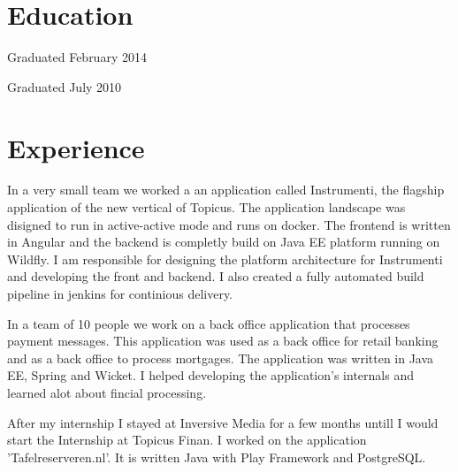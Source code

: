 \documentclass[]{deedy-resume-openfont}
\begin{document}
\begin{minipage}[t]{0.66\textwidth} 
	

\section{Education} 

Graduated February 2014 
\sectionsep

Graduated July 2010 
\sectionsep


\section{Experience}

In a very small team we worked a an application called Instrumenti, the flagship application of the new vertical of Topicus.
The application landscape was disigned to run in active-active mode and runs on docker. 
The frontend is written in Angular and the backend is completly build on Java EE platform running on Wildfly.
I am responsible for designing the platform architecture for Instrumenti and developing the front and backend.
I also created a fully automated build pipeline in jenkins for continious delivery.
\sectionsep

In a team of 10 people we work on a back office application that processes payment messages. 
This application was used as a back office for retail banking and as a back office to process mortgages.
The application was written in Java EE, Spring and Wicket.
I helped developing the application's internals and learned alot about fincial processing. 
\sectionsep

After my internship I stayed at Inversive Media for a few months untill I would start the Internship at Topicus Finan.
I worked on the application 'Tafelreserveren.nl'. 
It is written Java with Play Framework and PostgreSQL.
\sectionsep


\end{minipage}
\end{document}
